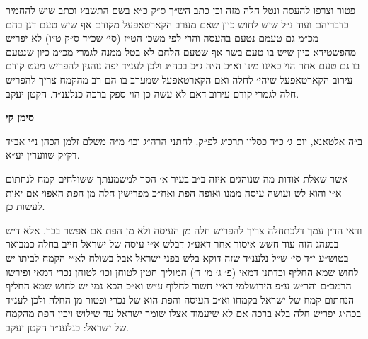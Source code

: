 \documentclass[12pt, openany]{book}
\newcommand{\chapname}{}
\newcommand{\newchap}[1]{
	\addcontentsline{toc}{chapter}{#1}
	\renewcommand{\chapname}{#1}
		\begin{center}
			\textbf{%
\fontsize{16pt}{16pt}\selectfont
				#1}
		\end{center}
}
\begin{document}
\begin{multicols}{2}
פטור וצרפו להעסה ונטל חלה מזה וכן כתב הש״ך ס״ק כ״א בשם התשבץ וכתב שיש להחמיר כדבריהם ועוד נ״ל שיש לחוש כיון שאם מערב הקארטאפעל מקודם אף שיש טעם דגן בהם מכ״מ גם טעמם נטעם בהעסה והרי לפי משכ׳ הט״ז (סי׳ שכ״ד ס״ק ט״ו) לא יפריש מהפשטידא כיון שיש בו טעם בשר אף שטעם הלחם לא בטל ממנה לגמרי מכ״מ כיון שנטעם בו גם טעם אחר הוי כאינו מינו וא״כ ה״ה ג״כ בכה״ג ולכן לענ״ד יפה נוהגין להפריש מעט קודם עירוב הקארטאפעל שיהי׳ לחלה ואם הקארטאפעל שמערב בו הם רב מהקמח צריך להפריש חלה לגמרי קודם עירוב דאם לא עשה כן הוי ספק ברכה כנלענ״ד. הקטן יעקב.\\\vspace{0pt}

\end{multicols}\newpage

\newchap{סימן קי}
\begin{multicols}{2}
ב״ה אלטאנא, יום ג׳ כ״ד כסליו תרכ״ג לפ״ק. לחתני הרה״ג וכו׳ מ״ה משלם זלמן הכהן נ״י אב״ד דק״ק שווערין יע״א.\\\vspace{0pt}

אשר שאלת אודות מה שנוהגים איזה ב״ב בעיר א׳ הסר למשמעתך ששולחים קמח לנחתום א״י והוא לש ועושה עיסה ממנו ואופה הפת ואח״כ מפרישין חלה מן הפת האפוי אם יאות לעשות כן.\\\vspace{0pt}

ודאי הדין עמך דלכתחלה צריך להפריש חלה מן העיסה ולא מן הפת אם אפשר בכך. אלא דיש במנהג הזה עוד חשש איסור אחר דאע״ג דבלש א״י עיסה של ישראל חייב בחלה כמבואר בטוש״ע י״ד סי׳ ש״ל נלענ״ד שזה דוקא בלש בפני ישראל אבל בשולח לא״י הקמח לביתו יש לחוש שמא החליף וכדתנן דמאי (פ׳ ג׳ מ׳ ד׳) המוליך חטין לטוחן וכו׳ לטוחן נכרי דמאי ופירשו הרמב״ם והר״ש ע״פ הירושלמי דא״י חשוד לחלוף ע״ש וא״כ הכא נמי יש לחוש שמא החליף הנחתום קמח של ישראל בקמחו וא״כ העיסה והפת הוא של נכרי ופטור מן החלה ולכן לענ״ד בכה״ג יפריש חלה בלא ברכה אם לא שיעמוד אצלו שומר ישראל עד שילוש ויכין הפת מהקמח של ישראל: כנלענ״ד הקטן יעקב.\\\vspace{0pt}

\end{multicols}\newpage
\end{document}
